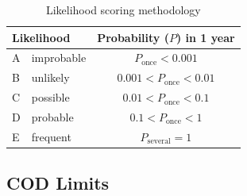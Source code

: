 \begin{table}[H]
\centering
\caption{Likelihood scoring methodology}
\label{tab:likelihood-methodology}
\begin{tabular}{@{}llc@{}}
\toprule
\multicolumn{2}{l}{Likelihood} & Probability ($P$) in 1 year              \\ \midrule
A & improbable & $         P_\mathrm{once} < 0.001 $ \\
B & unlikely   & $ 0.001 < P_\mathrm{once} < 0.01  $ \\
C & possible   & $ 0.01  < P_\mathrm{once} < 0.1   $ \\
D & probable   & $ 0.1   < P_\mathrm{once} < 1     $ \\
E & frequent   & $         P_\mathrm{several} = 1  $ \\ \bottomrule
\end{tabular}
\end{table}










\subsection{COD Limits}
\label{app:COD}


